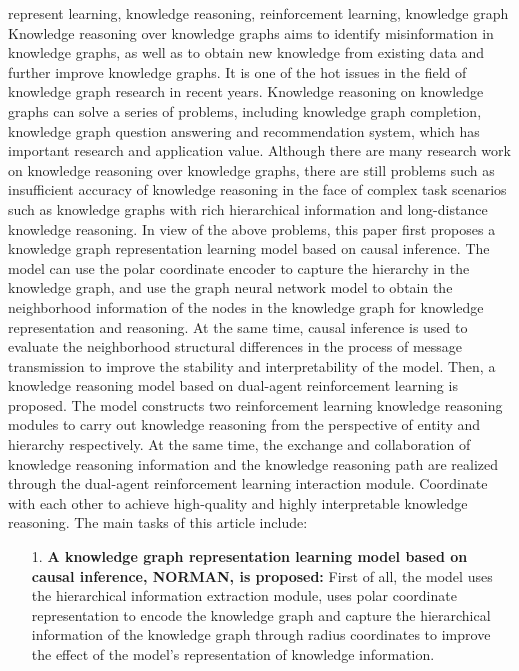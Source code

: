 \documentclass[algorithmlist, AutoFakeBold, AutoFakeSlant, figurelist, tablelist, nomlist, masters]{seuthesix}
\begin{document}
\begin{englishabstract}{represent learning, knowledge reasoning, reinforcement learning, knowledge graph}
  Knowledge reasoning over knowledge graphs aims to identify misinformation in knowledge graphs, as well as to obtain new knowledge from existing data and further improve knowledge graphs. 
  It is one of the hot issues in the field of knowledge graph research in recent years. 
  Knowledge reasoning on knowledge graphs can solve a series of problems, including knowledge graph completion, knowledge graph question answering and recommendation system, which has important research and application value. 
  Although there are many research work on knowledge reasoning over knowledge graphs, there are still problems such as insufficient accuracy of knowledge reasoning in the face of complex task scenarios such as knowledge graphs with rich hierarchical information and long-distance knowledge reasoning. 
  In view of the above problems, this paper first proposes a knowledge graph representation learning model based on causal inference. 
  The model can use the polar coordinate encoder to capture the hierarchy in the knowledge graph, and use the graph neural network model to obtain the neighborhood information of the nodes in the knowledge graph for knowledge representation and reasoning. 
  At the same time, causal inference is used to evaluate the neighborhood structural differences in the process of message transmission to improve the stability and interpretability of the model.
  Then, a knowledge reasoning model based on dual-agent reinforcement learning is proposed. 
  The model constructs two reinforcement learning knowledge reasoning modules to carry out knowledge reasoning from the perspective of entity and hierarchy respectively. 
  At the same time, the exchange and collaboration of knowledge reasoning information and the knowledge reasoning path are realized through the dual-agent reinforcement learning interaction module. 
  Coordinate with each other to achieve high-quality and highly interpretable knowledge reasoning. 
  The main tasks of this article include:
  \begin{itemize}
    \item [1.]\textbf{A knowledge graph representation learning model based on causal inference, NORMAN, is proposed:}
    First of all, the model uses the hierarchical information extraction module, uses polar coordinate representation to encode the knowledge graph and capture the hierarchical information of the knowledge graph through radius coordinates to improve the effect of the model's representation of knowledge information.

\end{itemize}
\end{englishabstract}
\end{document}
